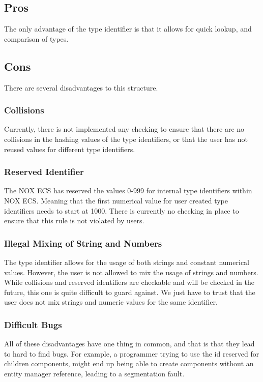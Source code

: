 \subsection{Pros}
The only advantage of the type identifier is that it allows for quick lookup, and comparison of types.

\subsection{Cons}
There are several disadvantages to this structure.

\subsubsection{Collisions}
Currently, there is not implemented any checking to ensure that there are no collisions in the hashing values of the type identifiers, or that the user has not reused values for different type identifiers.

\subsubsection{Reserved Identifier}
The NOX ECS has reserved the values 0-999 for internal type identifiers within NOX ECS.
Meaning that the first numerical value for user created type identifiers needs to start at 1000. There is currently no checking in place to ensure that this rule is not violated by users.

\subsubsection{Illegal Mixing of String and Numbers}
The type identifier allows for the usage of both strings and constant numerical values.
However, the user is not allowed to mix the usage of strings and numbers.
While collisions and reserved identifiers are checkable and will be checked in the future,
this one is quite difficult to guard against.
We just have to trust that the user does not
mix strings and numeric values for the same identifier.

\subsubsection{Difficult Bugs}
All of these disadvantages have one thing in common, and that is that they lead to hard to find bugs.
For example, a programmer trying to use the id reserved for children components, might end up being able to create components without an entity manager reference, leading to a segmentation fault.
